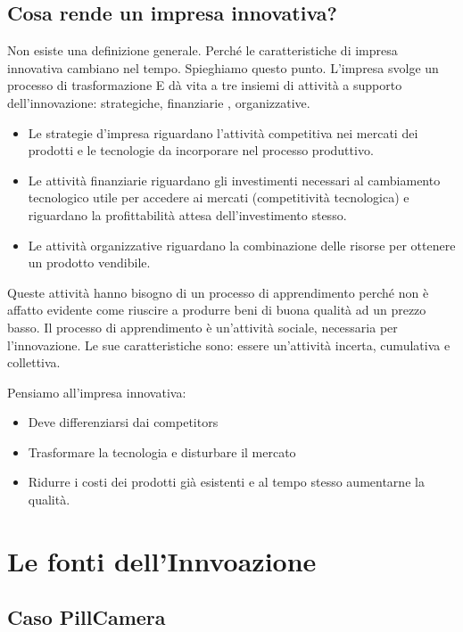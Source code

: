 \documentclass{article}
\begin{document}
\subsection{Cosa rende un impresa innovativa?}
Non esiste una definizione generale. Perché le caratteristiche di impresa innovativa
cambiano nel tempo. Spieghiamo questo punto.
L’impresa svolge un processo di trasformazione E dà vita a tre insiemi di attività a supporto dell’innovazione: strategiche, finanziarie , organizzative.
\begin{itemize}
    \item Le strategie d’impresa riguardano l’attività competitiva nei mercati dei
prodotti e le tecnologie da incorporare nel processo produttivo.
\item Le attività finanziarie riguardano gli investimenti necessari al cambiamento
tecnologico utile per accedere ai mercati (competitività tecnologica) e
riguardano la profittabilità attesa dell’investimento stesso.
\item Le attività organizzative riguardano la combinazione delle risorse per
ottenere un prodotto vendibile.

\end{itemize}
Queste attività hanno bisogno di un processo di apprendimento perché non è
affatto evidente come riuscire a produrre beni di buona qualità ad un prezzo
basso. 
Il processo di apprendimento è un’attività sociale, necessaria per l’innovazione.
Le sue caratteristiche sono: essere un’attività incerta, cumulativa e collettiva.

Pensiamo all’impresa innovativa: 
\begin{itemize}
    \item Deve differenziarsi dai competitors
    \item Trasformare la tecnologia e disturbare il mercato 
    \item Ridurre i costi dei prodotti già esistenti e al tempo stesso aumentarne la qualità.
\end{itemize}

\section{Le fonti dell'Innvoazione	}
\subsection{Caso PillCamera }
\end{document}
